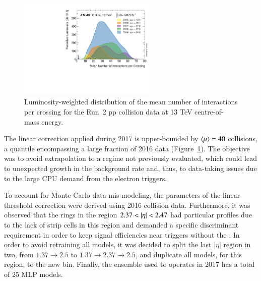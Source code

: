 



%
%



\begin{figure}[h!t]
\centering
\includegraphics[width=0.6\textwidth]{sections/03_ringer/figures/mu_2015_2018.pdf}
\caption{\label{fig:mu_2015_2018}
Luminosity-weighted distribution of the mean number of interactions per crossing
for the Run~2 pp collision data at 13 TeV centre-of-mass
energy.~\cite{atlas_lumi_run2_results}}
\end{figure}


The linear correction applied during 2017 is upper-bounded by $\langle \mu \rangle=40$
collisions, a quantile encompassing a large fraction of 2016 data
(Figure~\ref{fig:mu_2015_2018}). The objective was to avoid extrapolation to a
regime not previously evaluated, which could lead to unexpected growth in the
background rate and, thus, to data-taking issues due to the large CPU demand
from the electron triggers.

To account for Monte Carlo data mis-modeling, the parameters of the linear threshold
correction were derived using 2016 collision data. Furthermore, it was observed
that the rings in the region $2.37<\abseta<2.47$ had particular profiles due to
the lack of strip cells in this region and demanded a specific discriminant requirement in order to keep signal efficiencies near triggers without the \rnn{}. In order to avoid retraining all models, it was decided to split the last $|\eta|$ region in two, from $1.37\rightarrow 2.5$ to $1.37\rightarrow2.37\rightarrow2.5$, and duplicate all models, for this region, to the new bin. Finally, the ensemble used to operates in 2017 has a total of 25 MLP models.



